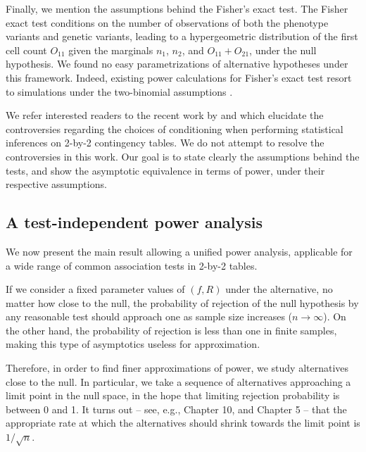 Finally, we mention the assumptions behind the Fisher's exact test.
The Fisher exact test conditions on the number of observations of both the phenotype variants and genetic variants, leading to a hypergeometric distribution of the first cell count $O_{11}$ given the marginals $n_1$, $n_2$, and $O_{11}+O_{21}$, under the null hypothesis.
We found no easy parametrizations of alternative hypotheses under this framework.
Indeed, existing power calculations for Fisher's exact test resort to simulations under the two-binomial assumptions \citep{Smyth17}.

We refer interested readers to the recent work by \citet{Ripamonti17} and \citet{Choi17} which elucidate the controversies regarding the choices of conditioning when performing statistical inferences on 2-by-2 contingency tables.
We do not attempt to resolve the controversies in this work.
Our goal is to state clearly the assumptions behind the tests, and show the asymptotic equivalence in terms of power, under their respective assumptions.

\subsection{A test-independent power analysis}
\label{subsec:power-calculation}

We now present the main result allowing a unified power analysis, applicable for a wide range of common association tests in 2-by-2 tables.

If we consider a fixed parameter values of $(f, R)$ under the alternative, no matter how close to the null, the probability of rejection of the null hypothesis by any reasonable test should approach one as sample size increases ($n\to\infty$).
On the other hand, the probability of rejection is less than one in finite samples, making this type of asymptotics useless for approximation.

Therefore, in order to find finer approximations of power, we study alternatives close to the null.
In particular, we take a sequence of alternatives approaching a limit point in the null space, in the hope that limiting rejection probability is between 0 and 1.
It turns out -- see, e.g., \citet{Ferguson17} Chapter 10, and \citet{Lehmann04} Chapter 5 -- that the appropriate rate at which the alternatives should shrink towards the limit point is $1/\sqrt{n}$. %

